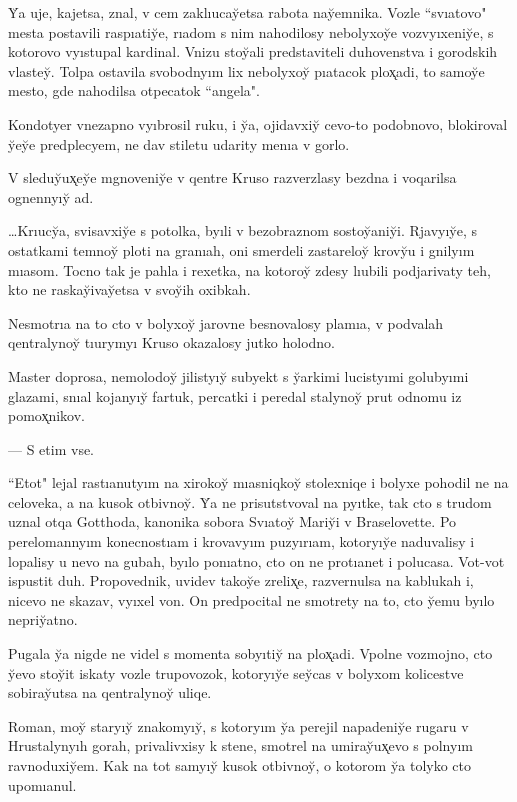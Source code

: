 \documentclass[10pt]{book}
\begin{document}
Y̆a uje, kajetsa, znal, v cem zaklıucay̆etsa rabota nay̆emnika. Vozle ``svıatovo" mesta postavili raspıatiy̆e, rıadom s nim nahodilosy nebolyxoy̆e vozvyıxeniy̆e, s kotorovo vyıstupal kardinal. Vnizu stoy̆ali predstaviteli duhovenstva i gorodskih vlastey̆. Tolpa ostavila svobodnyım lix nebolyxoy̆ pıatacok plox̨adi, to samoy̆e mesto, gde nahodilsa otpecatok ``angela".

Kondotyer vnezapno vyıbrosil ruku, i y̆a, ojidavxiy̆ cevo-to podobnovo, blokiroval y̆ey̆e predplecyem, ne dav stiletu udarity menıa v gorlo.

V sleduy̆ux̨ey̆e mgnoveniy̆e v qentre Kruso razverzlasy bezdna i voqarilsa ognennyıy̆ ad.



…Krıucy̆a, svisavxiy̆e s potolka, byıli v bezobraznom sostoy̆aniy̆i. Rjavyıy̆e, s ostatkami temnoy̆ ploti na granıah, oni smerdeli zastareloy̆ krovy̆u i gnilyım mıasom. Tocno tak je pahla i rexetka, na kotoroy̆ zdesy lıubili podjarivaty teh, kto ne raskay̆ivay̆etsa v svoy̆ih oxibkah.

Nesmotrıa na to cto v bolyxoy̆ jarovne besnovalosy plamıa, v podvalah qentralynoy̆ tıurymyı Kruso okazalosy jutko holodno.

Master doprosa, nemolodoy̆ jilistyıy̆ subyekt s y̆arkimi lucistyımi golubyımi glazami, snıal kojanyıy̆ fartuk, percatki i peredal stalynoy̆ prut odnomu iz pomox̨nikov.

— S etim vse.

``Etot" lejal rastıanutyım na xirokoy̆ mıasniqkoy̆ stolexniqe i bolyxe pohodil ne na celoveka, a na kusok otbivnoy̆. Y̆a ne prisutstvoval na pyıtke, tak cto s trudom uznal otqa Gotthoda, kanonika sobora Svıatoy̆ Mariy̆i v Braselovette. Po perelomannyım konecnostıam i krovavyım puzyırıam, kotoryıy̆e naduvalisy i lopalisy u nevo na gubah, byılo ponıatno, cto on ne protıanet i polucasa. Vot-vot ispustit duh. Propovednik, uvidev takoy̆e zrelix̨e, razvernulsa na kablukah i, nicevo ne skazav, vyıxel von. On predpocital ne smotrety na to, cto y̆emu byılo nepriy̆atno.

Pugala y̆a nigde ne videl s momenta sobyıtiy̆ na plox̨adi. Vpolne vozmojno, cto y̆evo stoy̆it iskaty vozle trupovozok, kotoryıy̆e sey̆cas v bolyxom kolicestve sobiray̆utsa na qentralynoy̆ uliqe.

Roman, moy̆ staryıy̆ znakomyıy̆, s kotoryım y̆a perejil napadeniy̆e rugaru v Hrustalynyıh gorah, privalivxisy k stene, smotrel na umiray̆ux̨evo s polnyım ravnoduxiy̆em. Kak na tot samyıy̆ kusok otbivnoy̆, o kotorom y̆a tolyko cto upomıanul.
\end{document}
